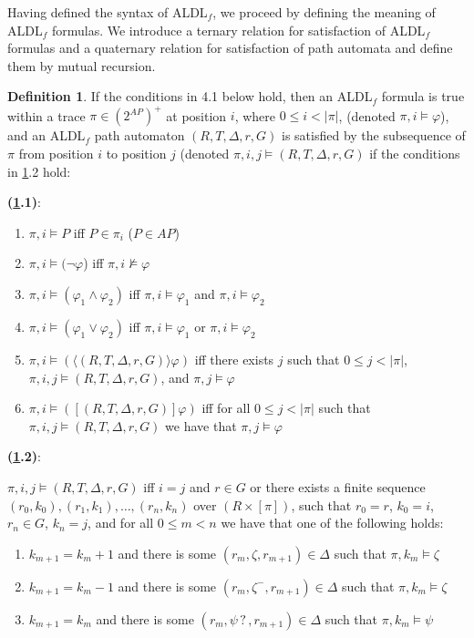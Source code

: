 \documentclass{lmcs}
\theoremstyle{definition}
\newtheorem{definition}[thm]{Definition}
\newcommand{\dbox}[1]{\langle #1 \rangle}
\newcommand{\bbox}[1]{[ #1 ]}
\DeclareMathOperator{\?}{?}
\begin{document}
Having defined the syntax of ALDL$_f$, we proceed by defining the meaning of ALDL$_f$ formulas. We introduce a ternary relation for satisfaction of ALDL$_f$ formulas and a quaternary relation for
satisfaction of path automata and define them by mutual recursion.

\begin{definition}\label{def:aldlf_semantics}
If the conditions in 4.1 below hold, then
an ALDL$_f$ formula is true within a trace $\pi \in (2^{AP})^+$ at position $i$,
    where $0 \leq i < |\pi|$, (denoted $\pi,i \models \varphi$),
    and an ALDL$_f$ path automaton $(R,T,\Delta,r,G)$ is satisfied by the subsequence of $\pi$ from position $i$ to position $j$ (denoted
    $\pi,i,j \models (R,T,\Delta,r,G)$ if the conditions in \ref{def:aldlf_semantics}.2 hold:

    \textbf{(\ref{def:aldlf_semantics}.1)}:
    \begin{enumerate}[label=A\arabic*.]
    \item $\pi,i \models P$ iff $P \in \pi_i$ ($P \in AP$)
    \item $\pi,i \models (\neg\varphi$) iff $\pi,i \not\models \varphi$
    \item $\pi,i \models (\varphi_1 \wedge \varphi_2)$ iff $\pi,i \models \varphi_1$ and $\pi,i \models \varphi_2$
    \item $\pi,i \models (\varphi_1 \vee \varphi_2)$ iff $\pi,i \models \varphi_1$ or $\pi,i \models \varphi_2$
    \item $\pi,i \models (\dbox{(R,T,\Delta,r,G)}\varphi)$ iff there exists $j$ such that $0 \leq j < |\pi|$, $\pi,i,j \models (R,T,\Delta,r,G)$, and $\pi,j \models \varphi$
    \item $\pi,i \models (\bbox{(R,T,\Delta,r,G)}\varphi)$ iff for all $0 \leq j < |\pi|$ such that $\pi,i,j \models (R,T,\Delta,r,G)$ we have that $\pi,j \models \varphi$
    \end{enumerate}


    \textbf{(\ref{def:aldlf_semantics}.2)}:

$\pi,i,j \models (R,T,\Delta,r,G)$ iff $i = j$ and $r \in G$ or there exists a finite sequence $(r_0,k_0),\allowbreak (r_1,k_1),\ldots,(r_n,k_n)$ over $(R \times [\pi])$,  such that $r_0 = r$, $k_0 = i$, $r_n \in G$, $k_n = j$, and for all $0 \leq m < n$ we have that one of the following holds:

\begin{enumerate}
    \item $k_{m+1} = k_m + 1$ and there is some $(r_m,\zeta,r_{m+1}) \in \Delta$ such that $\pi,k_m \models \zeta$
    \item $k_{m+1} = k_m - 1$ and there is some $(r_m,\zeta^-,r_{m+1}) \in \Delta$ such that $\pi,k_m \models \zeta$
    \item $k_{m+1} = k_m$ and there is some $(r_m,\psi\?,r_{m+1}) \in \Delta$ such that $\pi,k_m \models \psi$
\end{enumerate}

\end{definition}
\end{document}
